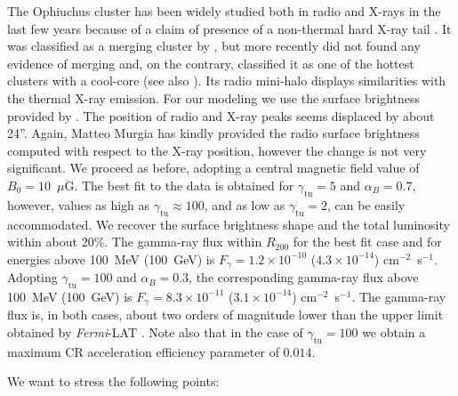 \documentclass[traditabstract]{aa}
\newcommand{\rmn}{\mathrm}
\begin{document}
The Ophiuchus cluster has been widely studied both in radio and X-rays in the last few years because of a claim of presence of a non-thermal hard X-ray tail \citep{2008A&A...479...27E,2008PASJ...60.1133F,2009A&A...499..371G,2009A&A...499..679M,2009MNRAS.396.2237P,2009A&A...508.1161N,2010A&A...514A..76M,2010MNRAS.405.1624M}. 
It was classified as a merging cluster by \cite{2001PASJ...53..605W}, but more recently \cite{2008PASJ...60.1133F} did not found any evidence of merging and, on the contrary, classified it as one of the hottest clusters with a  cool-core (see also \citealp{2010MNRAS.405.1624M}). Its radio mini-halo displays similarities with the thermal X-ray emission. For our modeling we use the surface brightness provided by \cite{2009A&A...499..679M}. The position of radio and X-ray peaks seems displaced by about 24''. Again, Matteo Murgia has kindly provided the radio surface brightness computed with respect to the \cite{2002ApJ...567..716R} X-ray position, however the change is not very significant. 
We proceed as before, adopting a central magnetic field value of $B_{0}=10$~$\mu$G. The best fit to the data is obtained for $\gamma_{\rmn{tu}}=5$ and $\alpha_B=0.7$, however, values as high as $\gamma_{\rmn{tu}} \approx 100$, and as low as $\gamma_{\rmn{tu}}=2$, can be easily accommodated. We recover the surface brightness shape and the total luminosity within about $20\%$. The gamma-ray flux within $R_{200}$ for the best fit case and for energies above 100~MeV (100~GeV) is $F_{\gamma} = 1.2 \times 10^{-10}$ ($4.3 \times 10^{-14}$) cm$^{-2}$~s$^{-1}$. Adopting $\gamma_{\rmn{tu}}=100$ and $\alpha_B=0.3$, the corresponding gamma-ray flux above 100~MeV (100~GeV) is $F_{\gamma} = 8.3 \times 10^{-11}$ ($3.1 \times 10^{-14}$) cm$^{-2}$~s$^{-1}$. The gamma-ray flux is, in both cases, about two orders of magnitude lower than the upper limit obtained by \emph{Fermi}-LAT \citep{2010ApJ...717L..71A}. Note also that in the case of $\gamma_{\rmn{tu}} = 100$ we obtain a maximum CR acceleration efficiency parameter of $0.014$. 

We want to stress the following points:
\end{document}
